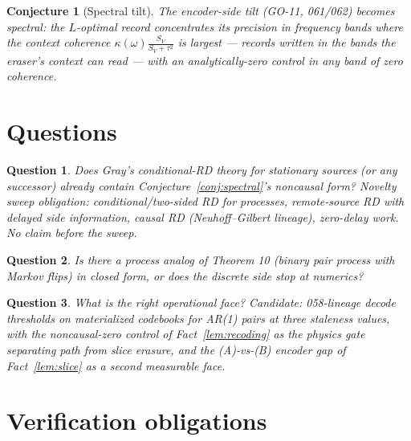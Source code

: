 ﻿\documentclass[11pt]{article}
\newtheorem{conjecture}{Conjecture}
\newtheorem{question}{Question}
\theoremstyle{remark}
\begin{document}
\begin{conjecture}[Spectral tilt]\label{conj:tilt}
The encoder-side tilt (GO-11, 061/062) becomes spectral: the $L$-optimal
record concentrates its precision in frequency bands where the context
coherence $\kappa(\omega)\tfrac{S_V}{S_V+\tau^2}$ is largest --- records
written in the bands the eraser's context can read --- with an
analytically-zero control in any band of zero coherence.
\end{conjecture}

\section{Questions}

\begin{question}
Does Gray's conditional-RD theory for stationary sources (or any
successor) already contain Conjecture~\ref{conj:spectral}'s noncausal
form? Novelty sweep obligation: conditional/two-sided RD for processes,
remote-source RD with delayed side information, causal RD
(Neuhoff--Gilbert lineage), zero-delay work. No claim before the sweep.
\end{question}

\begin{question}
Is there a process analog of Theorem 10 (binary pair process with
Markov flips) in closed form, or does the discrete side stop at
numerics?
\end{question}

\begin{question}
What is the right operational face? Candidate: 058-lineage decode
thresholds on materialized codebooks for AR(1) pairs at three staleness
values, with the noncausal-zero control of
Fact~\ref{lem:recoding} as the physics gate separating path from slice
erasure, and the (A)-vs-(B) encoder gap of Fact~\ref{lem:slice} as a
second measurable face.
\end{question}

\section{Verification obligations}
\end{document}
